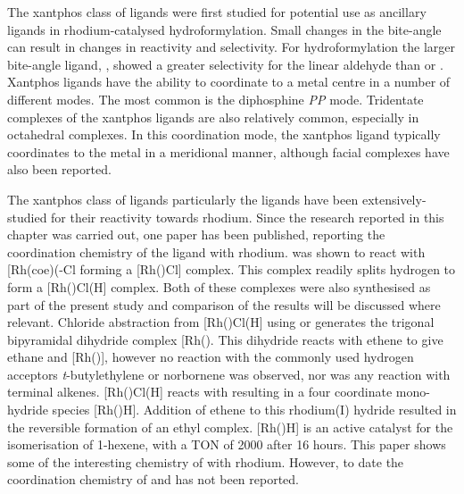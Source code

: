 
The xantphos class of ligands were first studied for potential use as ancillary ligands in rhodium-catalysed hydroformylation\cite{Kranenburg1995}.  Small changes in the bite-angle can result in changes in reactivity and selectivity.  For hydroformylation the larger bite-angle ligand, \Phxantphos{}, showed a greater selectivity for the linear aldehyde than \Phsixantphos{} or \Phthixantphos{}.  Xantphos ligands have the ability to coordinate to a metal centre in a number of different modes.  The most common is the diphosphine \dento{}\emph{PP\textprime} mode.  Tridentate \POP{} complexes of the xantphos ligands are also relatively common, especially in octahedral complexes.  In this \POP{} coordination mode, the xantphos ligand typically coordinates to the metal in a meridional manner, although facial complexes have also been reported.\cite{Dallanegra2012, Pawley2012}  

The xantphos class of ligands particularly the \Phxantphos{} ligands have been extensively-studied for their reactivity towards rhodium.  Since the research reported in this chapter was carried out, one paper has been published, reporting the coordination chemistry of the \tBuxantphos{} ligand with rhodium.\cite{Haibach2013}  \tBuXantphos{} was shown to react with [Rh(coe)(\hapto{}-Cl\ce{]2} forming a [Rh(\tBuxantphosk)Cl] complex.  This complex readily splits hydrogen to form a [Rh(\tBuxantphosk)Cl(H] complex.  Both of these complexes were also synthesised as part of the present study and comparison of the results will be discussed where relevant.  Chloride abstraction from  [Rh(\tBuxantphosk)Cl(H] using  or  generates the trigonal bipyramidal dihydride complex [Rh(\tBuxantphosk)\ce{(H)2]+}.  This dihydride reacts with ethene to give ethane and [Rh(\tBuxantphosk)], however no reaction with the commonly used hydrogen acceptors \emph{t}-butylethylene or norbornene was observed, nor was any reaction with terminal alkenes.  [Rh(\tBuxantphosk)Cl(H] reacts with  resulting in a four coordinate mono-hydride species [Rh(\tBuxantphos)H].  Addition of ethene to this rhodium(I) hydride resulted in the reversible formation of an ethyl complex.  [Rh(\tBuxantphos)H] is an active catalyst for the isomerisation of 1-hexene, with a TON of 2000 after 16 hours.  This paper shows some of the interesting chemistry of \tBuxantphos{} with rhodium.  However, to date the coordination chemistry of \tBusixantphos{} and \tButhixantphos{} has not been reported.  

